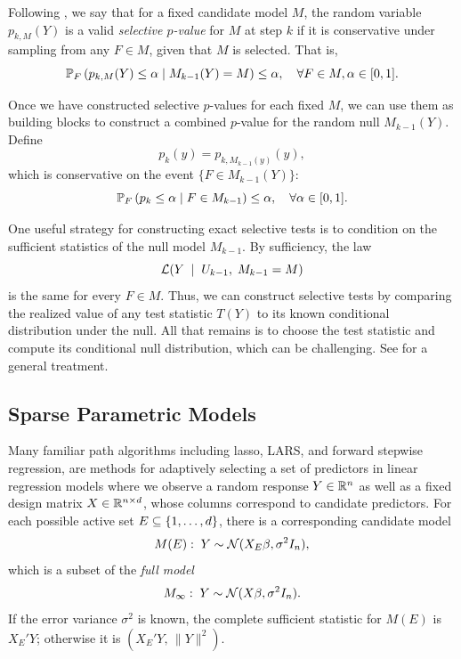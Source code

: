 \documentclass{article}
\begin{document}
Following \citet{fithian2014optimal}, we say that for a fixed candidate model $M$, the random variable $p_{k,M}(Y)$ is a valid {\em selective $p$-value} for $M$ at step $k$ if it is conservative under sampling from any $F\in M$, given that $M$ is selected. That is,
\begin{equation}
\P_F\left(p_{k,M}(Y) \leq \alpha \mid M_{k-1}(Y) = M\right) 
\leq \alpha, \quad \forall F\in M, \alpha \in [0,1].
\end{equation}

Once we have constructed selective $p$-values for each fixed $M$, we can use them as building blocks to construct a combined $p$-value for the random null $M_{k-1}(Y)$. Define
\[
p_k(y) = p_{k, M_{k-1}(y)}(y),
\]
which is conservative on the event $\{F \in M_{k-1}(Y)\}$:
\begin{equation}\label{eq:selectiveGuaranteePk}
\P_F\left(p_k \leq \alpha \mid F\in M_{k-1}\right) \leq \alpha, \quad \forall \alpha \in [0,1].
\end{equation}

One useful strategy for constructing exact selective tests is to condition on the sufficient statistics of the null model $M_{k-1}$. By sufficiency, the law
\[
\L(Y \;\mid\; U_{k-1}, \; M_{k-1}=M)
\]
is the same for every $F\in M$. Thus, we can construct selective tests by comparing the realized value of any test statistic $T(Y)$ to its known conditional distribution under the null. All that remains is to choose the test statistic and compute its conditional null distribution, which can be challenging. See \citet{fithian2014optimal} for a general treatment.

\subsection{Sparse Parametric Models}\label{sec:genSparse}

Many familiar path algorithms including lasso, LARS, and forward stepwise regression, are methods for adaptively selecting a set of predictors in linear regression models where we observe a random response $Y\in \R^n$ as well as a fixed design matrix $X\in \R^{n \times d}$, whose columns correspond to candidate predictors. For each possible active set $E \sub \{1,\ldots,d\}$, there is a corresponding candidate model
\[
M(E):\; Y \sim \cN( X_E\beta, \sigma^2 I_n),
\]
which is a subset of the {\em full model}
\[
M_\infty:\; Y \sim \cN(X\beta, \sigma^2I_n).
\]
If the error variance $\sigma^2$ is known, the complete sufficient statistic for $M(E)$ is $X_E'Y$; otherwise it is $\left(X_E'Y,\, \|Y\|^2\right)$.
\end{document}
